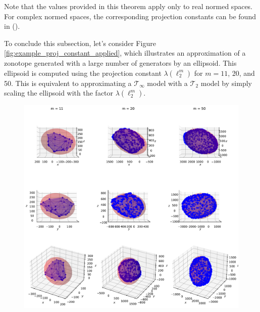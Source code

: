 Note that the values provided in this theorem apply only to real normed spaces. For complex normed spaces, the corresponding projection constants can be found in (\cite{defantProjectionConstantsSpaces2022}).

To conclude this subsection, let's consider Figure \ref{fig:example_proj_constant_applied}, which illustrates an approximation of a zonotope generated with a large number of generators by an ellipsoid. This ellipsoid is computed using the projection constant $\lambda(\ell_2^{m})$ for $m = 11$, 20, and 50.  This is equivalent to approximating a $\mathcal{T}_{\infty}$ model with a $\mathcal{T}_2$ model by simply scaling the ellipsoid with the factor $\lambda(\ell_2^{m})$.
\begin{figure}[!htb]
    \captionsetup{justification=centering}
    \begin{minipage}{1\linewidth}
        \centering
        \includegraphics[trim={0 700 0 0},clip, width=0.9\linewidth]{img/chapter_3/myIma5_projection_constant.pdf}
    \end{minipage}
    \begin{minipage}{1\linewidth}
        \centering

\end{minipage}
\end{figure}
